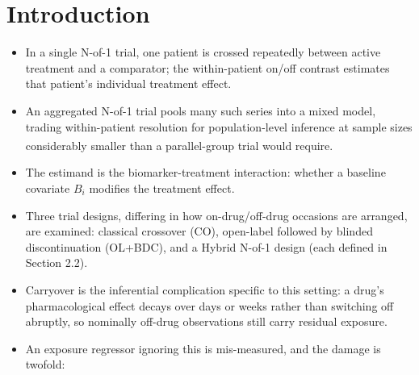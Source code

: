 \documentclass[
  11pt,
]{article}
\providecommand{\tightlist}{%
  \setlength{\itemsep}{0pt}\setlength{\parskip}{0pt}}
\begin{document}
\section{Introduction}\label{introduction}

\begin{itemize}
\tightlist
\item
  In a single N-of-1 trial, one patient is crossed repeatedly between
  active treatment and a comparator; the within-patient on/off
  contrast estimates that patient's individual treatment effect.
\item
  An aggregated N-of-1 trial pools many such series into a mixed
  model, trading within-patient resolution for population-level
  inference at sample sizes considerably smaller than a
  parallel-group trial would require\textsuperscript{}.
\item
  The estimand is the biomarker-treatment interaction: whether a
  baseline covariate \(B_i\) modifies the treatment effect.
\item
  Three trial designs, differing in how on-drug/off-drug occasions
  are arranged, are examined: classical crossover (CO), open-label
  followed by blinded discontinuation (OL+BDC), and a Hybrid N-of-1
  design (each defined in Section 2.2).
\item
  Carryover is the inferential complication specific to this setting:
  a drug's pharmacological effect decays over days or weeks rather
  than switching off abruptly, so nominally off-drug observations
  still carry residual exposure.
\item
  An exposure regressor ignoring this is mis-measured, and the
  damage is twofold:


\end{itemize}
\end{document}
